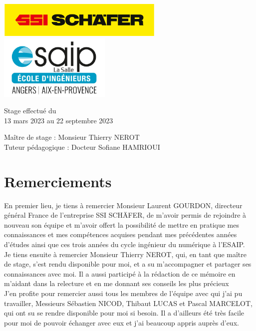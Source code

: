 \documentclass[a4paper, 12pt, french]{article}
\begin{document}
\begin{titlepage}
\begin{center}
			\vfill

			\includegraphics[width=0.6\textwidth]{images/schaefer.jpg}
			\vfill
			\includegraphics[width=0.4\textwidth]{images/esaip.jpg}

			\vfill

			Stage effectué du\\
			13 mars 2023 au 22 septembre 2023

			\vspace{0.8cm}
			
			\Large
			Maître de stage : Monsieur Thierry NEROT\\
			Tuteur pédagogique : Docteur Sofiane HAMRIOUI\\
		\end{center}
	\end{titlepage}
		
	\newpage
	\footnotesize
	\part*{Remerciements}		

		En premier lieu, je tiens à remercier Monsieur Laurent GOURDON, directeur général France de l'entreprise SSI SCHÄFER, de m’avoir permis de rejoindre à nouveau son équipe et m’avoir offert la possibilité de mettre en pratique mes connaissances et mes compétences acquises pendant mes précédentes années d’études ainsi que ces trois années du cycle ingénieur du numérique à l’ESAIP. \\

		Je tiens ensuite à remercier Monsieur Thierry NEROT, qui, en tant que maître de stage, s'est rendu disponible pour moi, et a su m'accompagner et partager ses connaissances avec moi. Il a aussi participé à la rédaction de ce mémoire en m'aidant dans la relecture et en me donnant ses conseils les plus précieux\\

		J’en profite pour remercier aussi tous les membres de l’équipe avec qui j’ai pu travailler, Messieurs Sébastien NICOD, Thibaut LUCAS et Pascal MARCELOT, qui ont su se rendre disponible pour moi si besoin. Il a d'ailleurs été très facile pour moi de pouvoir échanger avec eux et j'ai beaucoup appris auprès d'eux.\\
\end{document}
